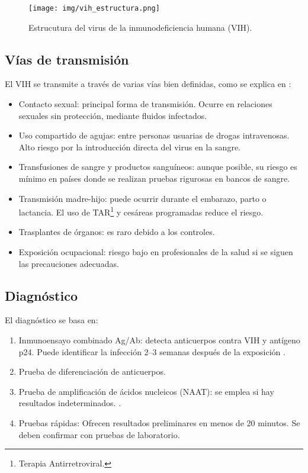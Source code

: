 \begin{figure}[H]
    \centering
    \texttt{[image: img/vih\_estructura.png]}
    \caption{Estrucutura del virus de la inmunodeficiencia humana (VIH).}
    \label{fig:vih estructura}
    \vspace{0.5cm} %
\end{figure}

\subsection{Vías de transmisión}
El VIH se transmite a través de varias vías bien definidas, como se explica en \cite{shaw2012hiv}:
\begin{itemize}
    \item Contacto sexual: principal forma de transmisión. Ocurre en relaciones sexuales sin protección, mediante fluidos infectados.
    \item Uso compartido de agujas: entre personas usuarias de drogas intravenosas. Alto riesgo por la introducción directa del virus en la sangre.
    \item Transfusiones de sangre y productos sanguíneos: aunque posible, su riesgo es mínimo en países donde se realizan pruebas rigurosas en bancos de sangre.
    \item Transmisión madre-hijo: puede ocurrir durante el embarazo, parto o lactancia. El uso de TAR\footnote{Terapia Antirretroviral.} y cesáreas programadas reduce el riesgo.
    \item Trasplantes de órganos: es raro debido a los controles.
    \item Exposición ocupacional: riesgo bajo en profesionales de la salud si se siguen las precauciones adecuadas.
\end{itemize}

\subsection{Diagnóstico}
El diagnóstico se basa en:
\begin{enumerate}
    \item Inmunoensayo combinado Ag/Ab: detecta anticuerpos contra VIH y antígeno p24. Puede identificar la infección 2–3 semanas después de la exposición \cite{workowski2021sexually}.
    \item Prueba de diferenciación de anticuerpos.
    \item Prueba de amplificación de ácidos nucleicos (NAAT): se emplea si hay resultados indeterminados. \cite{saag2021hiv}.
    \item Pruebas rápidas: Ofrecen resultados preliminares en menos de 20 minutos. Se deben confirmar con pruebas de laboratorio.
\end{enumerate}

